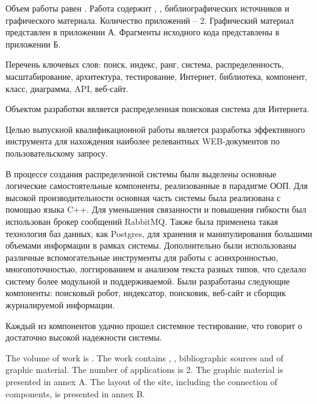 
Объем работы равен . Работа содержит , ,  библиографических источников и  графического материала. Количество приложений – 2. Графический материал представлен в приложении А. Фрагменты исходного кода представлены в приложении Б.

Перечень ключевых слов: поиск, индекс, ранг, система, распределенность, масштабирование, архитектура, тестирование, Интернет, библиотека, компонент, класс, диаграмма, API, веб-сайт.

Объектом разработки является распределенная поисковая система для Интернета.

Целью выпускной квалификационной работы является разработка эффективного инструмента для нахождения наиболее релевантных WEB-документов по пользовательскому запросу.

В процессе создания распределенной системы были выделены основные логические самостоятельные компоненты, реализованные в парадигме ООП. Для высокой производительности основная часть системы была реализована с помощью языка C++. Для уменьшения связанности и повышения гибкости был использован брокер сообщений RabbitMQ. Также была применена такая технология баз данных, как Postgres, для хранения и манипулирования большими объемами информации в рамках системы. Дополнительно были использованы различные вспомогательные инструменты для работы с асинхронностью, многопоточностью, логгированием и анализом текста разных типов, что сделало систему более модульной и поддерживаемой. Были разработаны следующие компоненты: поисковый робот, индексатор, поисковик, веб-сайт и сборщик журналируемой информации.

Каждый из компонентов удачно прошел системное тестирование, что говорит о достаточно высокой надежности системы.

  
The volume of work is . The work contains , ,  bibliographic sources and  of graphic material. The number of applications is 2. The graphic material is presented in annex A. The layout of the site, including the connection of components, is presented in annex B.

